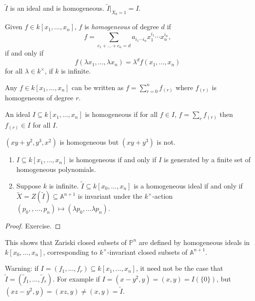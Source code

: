 \documentclass[a4paper]{article}
\renewcommand{\A}{\mathbb{A}}
\renewcommand*{\P}{\mathbb{P}}
\begin{document}
\begin{ex}
  \(\tilde I\) is an ideal and is homogeneous. \(\tilde I|_{X_0 = 1} = I\).
\end{ex}

\begin{definition}
  Given \(f \in k[x_1, \dots, x_n]\), \(f\) is \emph{homogeneous} of degree \(d\) if
  \[
    f = \sum_{c_1 + \dots + c_n = d} a_{i_1 \cdots i_n} x_1^{i_1} \cdots x_n^{i_n},
  \]
  if and only if
  \[
    f(\lambda x_1, \dots, \lambda x_n) = \lambda^d f(x_1, \dots, x_n)
  \]
  for all \(\lambda \in k^\times\), if \(k\) is infinite.
\end{definition}

Any \(f \in k[x_1, \dots, x_n]\) can be written as \(f = \sum_{r = 0}^n f_{(r)}\) where \(f_{(r)}\) is homogeneous of degree \(r\).

\begin{definition}
  An ideal \(I \subseteq k[x_1, \dots, x_n]\) is homogeneous if for all \(f \in I\), \(f = \sum_r f_{(r)}\) then \(f_{(r)} \in I\) for all \(I\).
\end{definition}

\begin{eg}
  \((xy + y^2, y^3, x^2)\) is homogeneous but \((xy + y^3)\) is not.
\end{eg}

\begin{lemma}\leavevmode
  \begin{enumerate}
  \item \(I \subseteq k[x_1, \dots, x_n]\) is homogeneous if and only if \(I\) is generated by a finite set of homogeneous polynomials.
  \item Suppose \(k\) is infinite. \(\tilde I \subseteq k[x_0, \dots, x_n]\) is a homogeneous ideal if and only if \(\tilde X = Z(\tilde I) \subseteq \A^{n + 1}\) is invariant under the \(k^\times\)-action \((p_0,, \dots, p_n) \mapsto (\lambda p_0, \dots \lambda p_n)\).
  \end{enumerate}
\end{lemma}

\begin{proof}
  Exercise.
\end{proof}

This shows that Zariski closed subsets of \(\P^n\) are defined by homogeneous ideals in \(k[x_0, \dots, x_n]\), corresponding to \(k^\times\)-invariant closed subsets of \(\A^{n + 1}\).

Warning: if \(I = (f_1, \dots, f_r) \subseteq k[x_1, \dots, x_n]\), it need not be the case that \(\tilde I = (\tilde f_1, \dots, \tilde f_r)\). For example if \(I = (x - y^2, y) = (x, y) = I(\{0\})\), but \((xz - y^2, y) = (xz, y) \neq (x, y) = \tilde I\).
\end{document}
